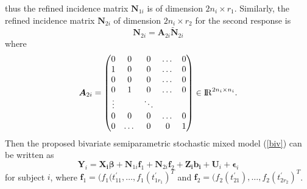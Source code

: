 \documentclass[12pt, notitlepage]{article}
\begin{document}
thus the refined incidence matrix $\boldsymbol N_{1i}$ is of dimension $2n_i \times r_1$.
 Similarly, the refined incidence matrix $\boldsymbol N_{2i}$ of dimension $2n_i \times r_2$ for the second response is 
$$
\boldsymbol N_{2i} = \boldsymbol A_{2i} \boldsymbol {\tilde N}_{2i}
$$
 where 
\[
\boldsymbol A_{2i} =
  \begin{pmatrix}
 0 & 0 & 0 &   \dots & 0 \\
1 & 0 & 0 &  \dots & 0 \\
 0 & 0 & 0 &   \dots & 0\\
0 & 1 & 0 & \dots & 0\\
  \vdots &  & \ddots &  \\ 
0 & 0 & 0 &   \dots & 0\\
0 & \dots & 0  & 0 & 1 \\
 \end{pmatrix}
  \in {\rm I\!R}^{2n_i \times n_i}.
 \]
Then the proposed bivariate semiparametric stochastic mixed model  (\ref{biv}) can be written as
$$
\boldsymbol Y_{i} 
=
\boldsymbol{X_{i}}\boldsymbol{\beta} +
 \boldsymbol N_{1i} \boldsymbol f_1 + 
  \boldsymbol N_{2i} \boldsymbol f_2 + 
\boldsymbol{Z_{i}}\boldsymbol{b_{i}} + 
\boldsymbol U_{i} + 
\boldsymbol \epsilon_{i}
$$
for subject $i$, where 
$\bm f_1 = (f_1(t_{11}^\prime, \dots, f_1(t_{1r_1}^\prime)^T$
and 
$\bm f_2 = (f_2(t_{21}^\prime), \dots, f_2(t_{2r_2}^\prime)^T$.

\end{document}
